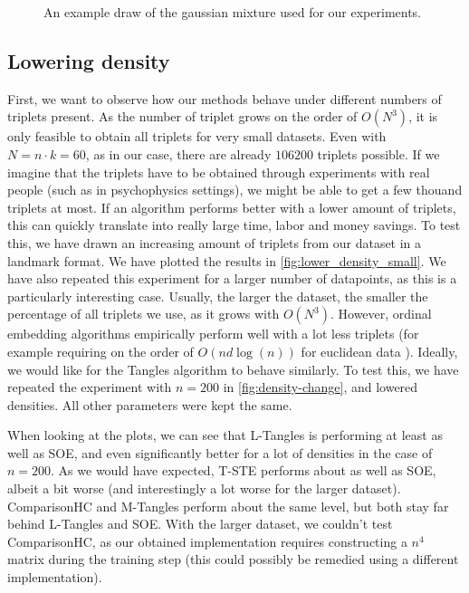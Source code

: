 \begin{figure}[h]
    \centering
    \resizebox{0.8\textwidth}{!}{}
    \label{fig:dataset-gauss}
    \caption{An example draw of the gaussian mixture used for our experiments.}
\end{figure}

\subsection{Lowering density}\label{lower_density}
First, we want to observe how our methods behave under different numbers of triplets present. As the number of triplet grows on the order of $O(N^3)$, it is only feasible to obtain
all triplets for very small datasets. Even with $N = n \cdot k = 60$, as in our case, there are already $106200$ triplets possible. If we imagine that the triplets have to be obtained 
through experiments with real people (such as in psychophysics settings), we might be able to get a few thouand triplets at most. If an algorithm performs better with a lower amount
of triplets, this can quickly translate into really large time, labor and money savings. To test this, we have drawn an increasing amount of triplets from our dataset in a landmark format.
We have plotted the results in \autoref{fig:lower_density_small}. We have also repeated this experiment for a larger number of datapoints, as this is a particularly interesting case. 
Usually, the larger the dataset, the smaller the percentage of all triplets we use, as it grows with $O(N^3)$. However, ordinal embedding algorithms empirically perform well with a lot
less triplets (for example requiring on the order of $O(n d \log(n))$ for euclidean data \citep{jainFiniteSamplePrediction2016}). 
Ideally, we would like for the Tangles algorithm to behave similarly. To test this, we have repeated the experiment with $n=200$ in \autoref{fig:density-change}, and lowered densities.
All other parameters were kept the same.

When looking at the plots, we can see that L-Tangles is performing at least as well as SOE, and even significantly better for a lot of densities in the case of $n=200$. 
As we would have expected, T-STE performs about as well as SOE, albeit a bit worse (and interestingly a lot worse for the larger dataset). ComparisonHC and M-Tangles
perform about the same level, but both stay far behind L-Tangles and SOE. With the larger dataset, we couldn't test ComparisonHC, as our obtained implementation requires 
constructing a $n^4$ matrix during the training step (this could possibly be remedied using a different implementation).

